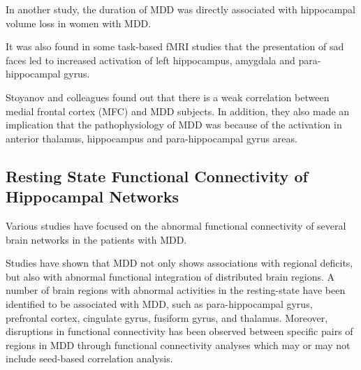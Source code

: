 \documentclass{article}
\begin{document}
In another study, the duration of MDD was directly associated with
hippocampal volume loss in women with MDD.

It was also found in some task-based fMRI studies that the
presentation of sad faces led to increased activation of left
hippocampus, amygdala and para-hippocampal gyrus.

Stoyanov and colleagues found out that there is a weak correlation
between medial frontal cortex (MFC) and MDD subjects. In addition,
they also made an implication that the pathophysiology of MDD was
because of the activation in anterior thalamus, hippocampus and
para-hippocampal gyrus areas.

\iffalse


Patients with MDD were prone to have an increased activity in the
medial prefrontal cortex (MPFC)/anterior cingulate cortex (ACC) areas
with diminished activity in posterior cingulate cortex(PCC)/precuneus
and bilateral angular gyrus areas.


1. Increased connectivity in depression in the bilateral dorsomedial
   prefrontal cortex

2. Increased functional network connectivity in the
   thalamus, subgenual cingulate, the precuneus and orbitofrontal
   cortex (OFC)

3. Decreased influence from the anterior insula to the
   middle frontal gyrus was found in medicated subjects with MDD

4. The relation that the right anterior insula has on depression
   pathophysiology was confirmed through the positive correlation
   between hippocampal node activation and severity of depression

\fi


\subsection{Resting State Functional Connectivity of Hippocampal Networks}

Various studies have focused on the abnormal functional connectivity
of several brain networks in the patients with MDD.

Studies have shown that MDD not only shows associations with regional
deficits, but also with abnormal functional integration of distributed
brain regions. A number of brain regions with abnormal activities in
the resting-state have been identified to be associated with MDD, such
as para-hippocampal gyrus, prefrontal cortex, cingulate gyrus,
fusiform gyrus, and thalamus. Moreover, disruptions in functional
connectivity has been observed between specific pairs of regions in
MDD through functional connectivity analyses which may or may not
include seed-based correlation analysis.
\end{document}
